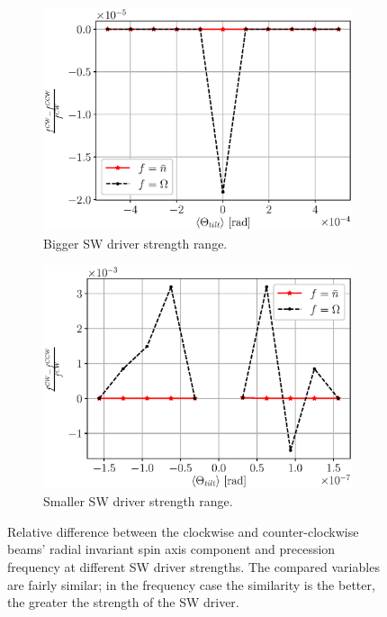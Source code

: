 \documentclass[]{elsarticle}
\begin{document}
\begin{figure}[h]\centering
  \begin{subfigure}{\linewidth}
    \includegraphics[width=\linewidth]{img/fake_signal/linearity_test_shifting_gauss_rel_diff.eps}
    \caption{Bigger SW driver strength range.\label{fig:MDM:reldiff:SW_big}}
  \end{subfigure}
  \begin{subfigure}{\linewidth}
    \includegraphics[width=\linewidth]{img/fake_signal/linearity_test_compensated+microrad_rel_diff.eps}
    \caption{Smaller SW driver strength range.\label{fig:MDM:reldiff:SW_small}}
  \end{subfigure}
  \caption{Relative difference between the clockwise and counter-clockwise beams'
    radial invariant spin axis component and precession frequency at different SW driver strengths.
    The compared variables are fairly similar; in the frequency case the similarity is the better, the
    greater the strength of the SW driver.\label{fig:MDM:reldiff}
  }
\end{figure}
\end{document}
